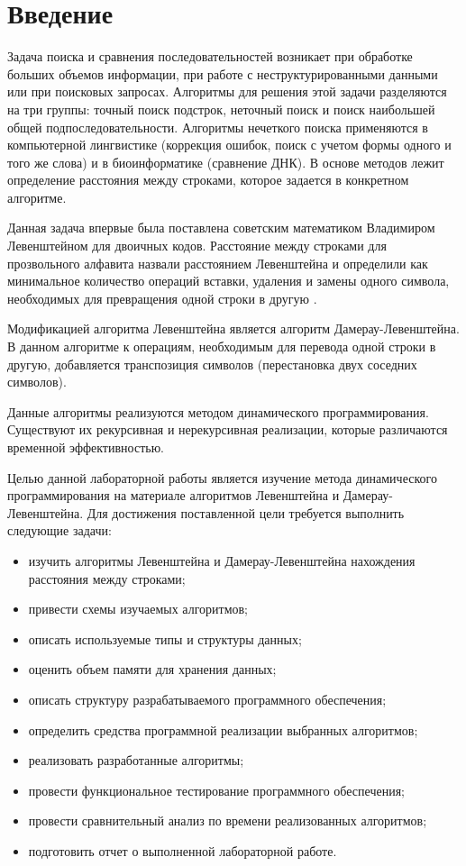 \chapter*{Введение}

Задача поиска и сравнения последовательностей возникает при обработке больших объемов информации, при работе с неструктурированными данными или при поисковых запросах. Алгоритмы для решения этой задачи разделяются на три группы: точный поиск подстрок, неточный поиск и поиск наибольшей общей подпоследовательности. Алгоритмы нечеткого поиска применяются в компьютерной лингвистике (коррекция ошибок, поиск с учетом формы одного и того же слова) и в биоинформатике (сравнение ДНК). В основе методов лежит определение расстояния между строками, которое задается в конкретном алгоритме.

Данная задача впервые была поставлена советским математиком Владимиром Левенштейном для двоичных кодов. Расстояние между строками для прозвольного алфавита назвали расстоянием Левенштейна и определили как минимальное количество операций вставки, удаления и замены одного символа, необходимых для превращения одной строки в другую \cite{foxford}.

Модификацией алгоритма Левенштейна является алгоритм Дамерау-Левенштейна. В данном алгоритме к операциям, необходимым для перевода одной строки в другую, добавляется транспозиция символов (перестановка двух соседних символов).

Данные алгоритмы реализуются методом динамического программирования. Существуют их рекурсивная и нерекурсивная реализации, которые различаются временной эффективностью.

Целью данной лабораторной работы является изучение метода динамического программирования на материале алгоритмов Левенштейна и Дамерау-Левенштейна. Для достижения поставленной цели требуется выполнить следующие задачи:

\begin{itemize}
	\item изучить алгоритмы Левенштейна и Дамерау-Левенштейна нахождения расстояния между строками;
	\item привести схемы изучаемых алгоритмов;
	\item описать используемые типы и структуры данных;
	\item оценить объем памяти для хранения данных;
	\item описать структуру разрабатываемого программного обеспечения;
	\item определить средства программной реализации выбранных алгоритмов;
	\item реализовать разработанные алгоритмы;
	\item провести функциональное тестирование программного обеспечения;
	\item провести сравнительный анализ по времени реализованных алгоритмов;
	\item подготовить отчет о выполненной лабораторной работе.
\end{itemize}